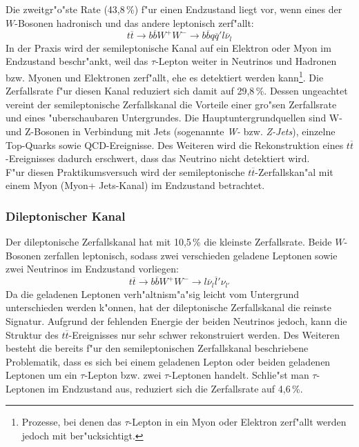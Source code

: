 Die zweitgr"o"ste Rate (43,8\,\%) f"ur einen Endzustand liegt vor, wenn eines der $W$-Bosonen hadronisch und das andere leptonisch zerf"allt:
\begin{equation*}
t\overline{t}\rightarrow b\overline{b}W^{+}W^{-}\rightarrow b\overline{b}q\overline{q}'l\overline{\nu}_{l}
\end{equation*}
In der Praxis wird der semileptonische Kanal auf ein Elektron oder Myon im Endzustand beschr"ankt, weil das $\tau$-Lepton weiter in Neutrinos und Hadronen bzw. Myonen und Elektronen zerf"allt, ehe es detektiert werden kann\footnote{Prozesse, bei denen das $\tau$-Lepton in ein Myon oder Elektron zerf"allt werden jedoch mit ber"ucksichtigt.}. Die Zerfallsrate f"ur diesen Kanal reduziert sich damit auf 29,8\,\%. Dessen ungeachtet vereint der semileptonische Zerfalls\-kanal die Vorteile einer gro"sen Zerfallsrate und eines "uberschaubaren Untergrundes. Die Hauptuntergrundquellen sind W- und Z-Bosonen in Verbindung mit Jets (sogenannte \textit{W-} bzw. \textit{Z-Jets}), einzelne Top-Quarks sowie QCD-Ereignisse. Des Weiteren wird die Rekonstruktion eines $t\overline{t}$-Ereignisses dadurch erschwert, dass das Neutrino nicht detektiert wird. \\
F"ur diesen Praktikumsversuch wird der semileptonische $t\overline{t}$-Zerfallskan"al mit einem My\-on (Myon+ Jets-Kanal) im Endzustand betrachtet.

\subsubsection*{Dileptonischer Kanal}
Der dileptonische Zerfallskanal hat mit 10,5\,\% die kleinste Zerfallsrate. Beide $W$-Bosonen zerfallen leptonisch, sodass zwei verschieden geladene Leptonen sowie zwei Neutrinos im Endzustand vorliegen:
\begin{equation*}
t\overline{t}\rightarrow b\overline{b}W^{+}W^{-}\rightarrow l\overline{\nu}_{l}\overline{l}'\nu_{l'}
\end{equation*}
Da die geladenen Leptonen verh"altnism"a"sig leicht vom Untergrund unterschieden werden k"onnen, hat der dileptonische Zerfallskanal die reinste Signatur. Aufgrund der fehlenden Energie der beiden Neutrinos jedoch, kann die Struktur des $t\overline{t}$-Ereignisses nur sehr schwer rekonstruiert werden. Des Weiteren besteht die bereits f"ur den semileptonischen Zerfalls\-kanal beschriebene Problematik, dass es sich bei einem geladenen Lepton oder beiden geladenen Leptonen um ein $\tau$-Lepton bzw. zwei $\tau$-Leptonen handelt. Schlie"st man $\tau$-Leptonen im Endzustand aus, reduziert sich die Zerfallsrate auf 4,6\,\%.


